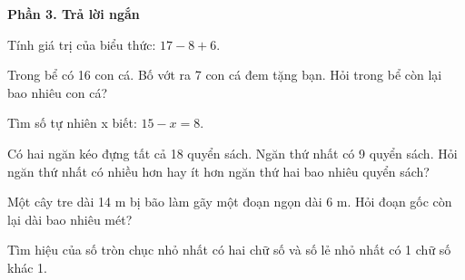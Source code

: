 \textbf{Phần 3. Trả lời ngắn}

\begin{ex} %
Tính giá trị của biểu thức: $17 - 8 + 6$.
\end{ex}

\begin{ex} %
Trong bể có 16 con cá. Bố vớt ra 7 con cá đem tặng bạn. Hỏi trong bể còn lại bao nhiêu con cá?
\end{ex}

\begin{ex} %
Tìm số tự nhiên x biết: $15 - x = 8$.
\end{ex}

\begin{ex} %
Có hai ngăn kéo đựng tất cả 18 quyển sách. Ngăn thứ nhất có 9 quyển sách. Hỏi ngăn thứ nhất có nhiều hơn hay ít hơn ngăn thứ hai bao nhiêu quyển sách?
\end{ex}

\begin{ex} %
Một cây tre dài 14 m bị bão làm gãy một đoạn ngọn dài 6 m. Hỏi đoạn gốc còn lại dài bao nhiêu mét?
\end{ex}

\begin{ex} %
Tìm hiệu của số tròn chục nhỏ nhất có hai chữ số và số lẻ nhỏ nhất có 1 chữ số khác 1.
\end{ex}
